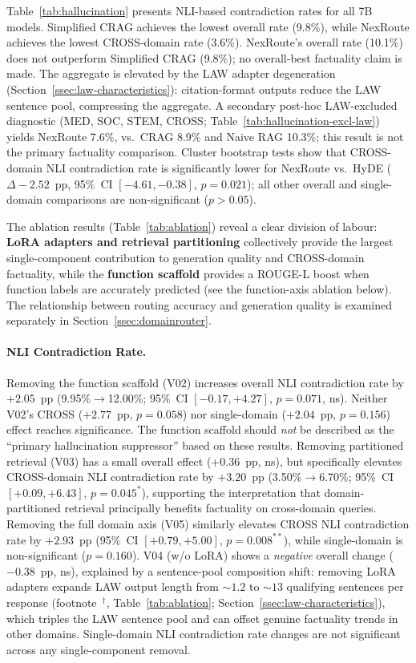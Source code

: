 \documentclass[a4paper,fleql,doubleblind]{cas-sc}
\begin{document}
Table~\ref{tab:hallucination} presents NLI-based contradiction rates for all 7B models.
Simplified CRAG achieves the lowest overall rate (9.8\%), while NexRoute achieves the
lowest CROSS-domain rate (3.6\%).
NexRoute's overall rate (10.1\%) does not outperform Simplified CRAG (9.8\%);
no overall-best factuality claim is made.
The aggregate is elevated by the LAW adapter degeneration
(Section~\ref{ssec:law-characteristics}): citation-format outputs reduce the LAW
sentence pool, compressing the aggregate.
A secondary post-hoc LAW-excluded diagnostic (MED, SOC, STEM, CROSS;
Table~\ref{tab:hallucination-excl-law}) yields NexRoute 7.6\%, vs.\ CRAG 8.9\%
and Naive RAG 10.3\%; this result is not the primary factuality comparison.
Cluster bootstrap tests show that CROSS-domain NLI contradiction rate is significantly lower
for NexRoute vs.\ HyDE ($\Delta{-}2.52$~pp, 95\%~CI $[-4.61,{-}0.38]$, $p{=}0.021$);
all other overall and single-domain comparisons are non-significant ($p{>}0.05$).

The ablation results (Table~\ref{tab:ablation}) reveal a clear division of labour:
\textbf{LoRA adapters and retrieval partitioning} collectively provide the largest
single-component contribution to generation quality and CROSS-domain factuality,
while the \textbf{function scaffold} provides a ROUGE-L boost when function labels are
accurately predicted (see the function-axis ablation below).
The relationship between routing accuracy and generation quality is examined
separately in Section~\ref{ssec:domainrouter}.

\paragraph{NLI Contradiction Rate.}
Removing the function scaffold (V02) increases overall NLI contradiction rate by $+2.05$~pp
(9.95\%$\to$12.00\%; 95\%~CI $[-0.17,{+}4.27]$, $p{=}0.071$, \textsf{ns}).
Neither V02's CROSS ($+2.77$~pp, $p{=}0.058$) nor single-domain ($+2.04$~pp,
$p{=}0.156$) effect reaches significance.
The function scaffold should \emph{not} be described as the ``primary hallucination
suppressor'' based on these results.
Removing partitioned retrieval (V03) has a small overall effect ($+0.36$~pp, \textsf{ns}),
but specifically elevates CROSS-domain NLI contradiction rate by $+3.20$~pp
(3.50\%$\to$6.70\%; 95\%~CI $[{+}0.09,{+}6.43]$, $p{=}0.045^{*}$), supporting
the interpretation that domain-partitioned retrieval principally benefits factuality
on cross-domain queries.
Removing the full domain axis (V05) similarly elevates CROSS NLI contradiction rate
by $+2.93$~pp (95\%~CI $[{+}0.79,{+}5.00]$, $p{=}0.008^{**}$), while single-domain
is non-significant ($p{=}0.160$).
V04 (w/o LoRA) shows a \textit{negative} overall change ($-0.38$~pp, \textsf{ns}),
explained by a sentence-pool composition shift: removing LoRA adapters expands LAW output
length from ${\sim}1.2$ to ${\sim}13$ qualifying sentences per response
(footnote~$^\dagger$, Table~\ref{tab:ablation}; Section~\ref{ssec:law-characteristics}),
which triples the LAW sentence pool and can offset genuine factuality trends in other domains.
Single-domain NLI contradiction rate changes are not significant across any single-component removal.
\end{document}
